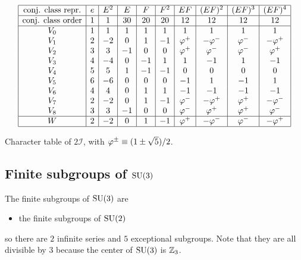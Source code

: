 \documentclass[a4paper,10pt]{article}
\begin{document}
            \begin{table}[H]
                \centering
                {\small
                \begin{equation*}
                        \begin{array}{|c|c|c|c|c|c|c|c|c|c|}
                            \hline
                            \text{conj. class repr.} & e & E^2 & E & F & F^2 & EF & (EF)^2 & (EF)^3 & (EF)^4 \\ \hline
                            \text{conj. class order} & 1 & 1 & 30 & 20 & 20 & 12 & 12 & 12 & 12\\
                            \hline
                            V_0 & 1 & 1 & 1 & 1 & 1 & 1 & 1 & 1 & 1 \\
                            V_1 & 2 & -2 & 0 & 1 & -1 & \varphi^+ & -\varphi^- & \varphi^- & -\varphi^+ \\
                            V_2 & 3 & 3 & -1 & 0 & 0 & \varphi^+ & \varphi^- & \varphi^- & \varphi^+ \\
                            V_3 & 4 & -4 & 0 & -1 & 1 & 1 & -1 & 1 & -1 \\
                            V_4 & 5 & 5 & 1 & -1 & -1 & 0 & 0 & 0 & 0 \\
                            V_5 & 6 & -6 & 0 & 0 & 0 & -1 & 1 & -1 & 1 \\
                            V_6 & 4 & 4 & 0 & 1 & 1 & -1 & -1 & -1 & -1 \\
                            V_7 & 2 & -2 & 0 & 1 & -1 & \varphi^- & -\varphi^+ & \varphi^+ & -\varphi^- \\
                            V_8 & 3 & 3 & -1 & 0 & 0 & \varphi^- & \varphi^+ & \varphi^+ & \varphi^- \\ \hline
                            W & 2 & -2 & 0 & 1 & -1 & \varphi^+ & -\varphi^- & \varphi^- & -\varphi^+ \\ \hline
                        \end{array}
                    \end{equation*}}
                \caption{Character table of $2\mathcal{I}$, with $\varphi^\pm\equiv(1\pm\sqrt{5})/2$.}
            \end{table}


    \subsection{Finite subgroups of $\text{SU}(3)$}

        The finite subgroups of $\text{SU}(3)$ are
        \begin{itemize}
            \item the finite subgroups of $\text{SU}(2)$
        \end{itemize}
        so there are $2$ infinite series and $5$ exceptional subgroups. Note that they are all divisible by $3$ because the center of $\text{SU}(3)$ is $\mathbb{Z}_3$.
\end{document}
